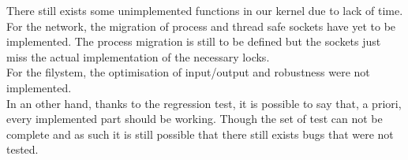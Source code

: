 There still exists some unimplemented functions in our kernel due to lack of
time.\\ 
For the network, the migration of process and thread safe sockets have
yet to be implemented. The process migration is still to be defined but the
sockets just miss the actual implementation of the necessary locks.\\
For the filystem, the optimisation of input/output and robustness were not
implemented.\\
In an other hand, thanks to the regression test, it is possible to say that, a
priori, every implemented part should be working. Though the set of test can
not be complete and as such it is still possible that there still exists bugs
that were not tested.\\
